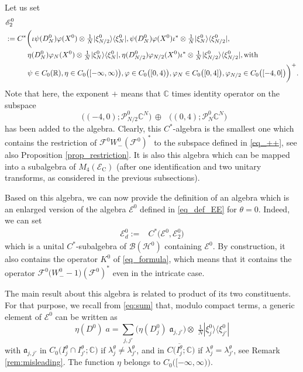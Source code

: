 \documentclass[11pt]{article}
\def\a{\mathfrak a}
\def\B{\mathscr B}
\def\C{\mathbb C}
\def\EE{\mathscr E}
\def\EEC{\mathscr E_{\mathrm C}}
\def\F{\mathscr F}
\def\Hrond{\mathscr H}
\def\P{\mathcal P}
\def\R{\mathbb R}
\def\ltwo{\mathop{\mathrm{L}^2}\nolimits}
\begin{document}
Let us set
\begin{align*}
&\EE^0_2\\
& := C^*\bigg(\iota \psi(D^0_N)\varphi(X^0)\otimes \tfrac{1}{N}|\xi^0_{N/2}\rangle \langle \xi^0_N|, \psi(D^0_N)\varphi(X^0)\iota^* \otimes \tfrac{1}{N}|\xi^0_{N}\rangle \langle \xi^0_{N/2}|, \\
&\qquad \quad \eta(D^0_N)\varphi_N(X^0)\otimes \tfrac{1}{N}|\xi^0_{N}\rangle \langle \xi^0_N|, \eta(D^0_{N/2})\varphi_{N/2}(X^0)\iota^* \otimes \tfrac{1}{N}|\xi^0_{N/2}\rangle \langle \xi^0_{N/2}|,   \hbox{with }\\
& \qquad \quad\psi \in C_0(\R),
\eta \in C_0\big([-\infty,\infty)\big),
 \varphi \in C_0\big([0,4)\big),
\varphi_N \in C_0\big([0,4]\big),\varphi_{N/2} \in C_0\big([-4,0]\big)
\bigg)^+.
\end{align*}
Note that here, the exponent $+$ means that $\C$ times identity operator on the subspace
\begin{equation}\label{eq_++}
\ltwo\big((-4,0);\P^0_{N/2} \C^N\big) \, \oplus  \, \ltwo\big((0,4);\P^0_N \C^N\big)
\end{equation}
has been added to the algebra. 
Clearly, this $C^*$-algebra is the smallest one which contains  the restriction of $\F^0 W^0_-(\F^0)^*$ to the subspace defined in \eqref{eq_++},
see also Proposition \ref{prop_restriction}. 
It is also this algebra which can be mapped into a subalgebra of $M_4(\EEC)$ (after one identification and two unitary transforms, as considered in the previous subsections).

Based on this algebra, we can now provide the definition of an algebra which is an enlarged version of the algebra $\EE^0$ defined in \eqref{eq_def_EE} for $\theta=0$. 
Indeed, we can set
\begin{align*}
\EE^0_d:=& C^*\big(\EE^0, \EE^0_2\big)
\end{align*}
which is a unital $C^*$-subalgebra of $\B(\Hrond^0)$ containing $\EE^0$. 
By construction, it also contains the operator $K^0$  of \eqref{eq_formula}, which means
that it contains the operator $\F^0\big(W_-^0-1\big)(\F^0)^*$
even in the intricate case.

The main result about this algebra is related to product of its two constituents.
For that purpose, we recall from \eqref{eq:sum} that, modulo compact terms, a generic element of $\EE^0$ can be written as
\begin{equation}
\eta(D^0)\;\!a
=  \sum_{j,j'}
\big(\eta(D^0_{j})\;\!\a_{j,j'}\big)\otimes \;\!\tfrac{1}{N}|\xi^0_j\rangle \langle \xi^0_{j'}|
\end{equation}
with $\a_{j,j'}$ in $C_0\big(I_j^\theta \cap I_{j'}^\theta; \C\big)$ if  
$\lambda_j^\theta\neq \lambda_{j'}^\theta$, and in $C\big(\overline{I_j^\theta}; \C\big)$ if $\lambda_j^\theta = \lambda_{j'}^\theta$, see Remark \ref{rem:misleading}.
The function $\eta$ belongs to $C_0\big([-\infty,\infty)\big)$.
\end{document}
